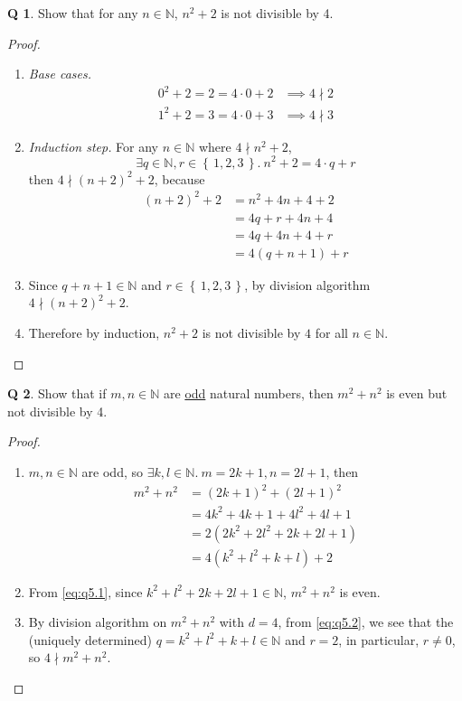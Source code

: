 \documentclass[12pt]{article}
\newcommand{\set}[1]{\left\{\,#1\,\right\}}
\theoremstyle{definition}
\newtheorem{qn}{Q}
\numberwithin{equation}{qn}
\newcommand{\nat}{\mathbb{N}}
\newenvironment{prf}
{
    \begin{proof}
        \hfill
        \begin{enumerate}[label*=\arabic*.]
                }
                {
                \hfill\qedsymbol
        \end{enumerate}
    \renewcommand{\qedsymbol}{}
    \end{proof}
}
\begin{document}
\newpage
\begin{qn}
    Show that for any $n \in\nat$, $n^2 + 2$ is not divisible by 4.
\end{qn}
\begin{prf}
\item \emph{Base cases.}
    \begin{align*}
        0^2 + 2 = 2 = 4\cdot0 + 2&\implies 4 \nmid 2 \\
        1^2 + 2 = 3 = 4\cdot0 + 3&\implies 4 \nmid 3
    \end{align*}
\item \emph{Induction step.} For any $n\in\nat$ where $4 \nmid n^2 + 2$,
    $$\exists q\in\nat, r\in\set{1,2,3}.~ n^2 + 2 = 4\cdot q + r$$
    then $4\nmid (n+2)^2 + 2$, because
    \begin{align*}
        (n+2)^2 + 2 &= n^2 + 4n + 4 + 2     \\
                    &= 4q + r + 4n + 4      \\
                    &= 4q + 4n + 4 + r      \\
                    &= 4(q + n + 1) + r
    \end{align*}
\item Since $q + n + 1 \in\nat$ and $r\in\set{1,2,3}$, by division algorithm $4\nmid (n+2)^2 + 2$.
\item Therefore by induction, $n^2 + 2$ is not divisible by $4$ for all $n\in\nat$.
\end{prf}

\begin{qn}
    Show that if $m,n\in\nat$ are \underline{odd} natural numbers,
    then $m^2 + n^2$ is even but not divisible by 4.
\end{qn}
\begin{prf}
\item $m,n \in\nat$ are odd, so $\exists k, l\in\nat.~ m=2k+1, n=2l+1$, then
    \begin{align}
        m^2 + n^2 &= (2k+1)^2 + (2l+1)^2    \\
        &= 4k^2 + 4k + 1 + 4l^2 + 4l + 1    \\
        &= 2(2k^2 + 2l^2 + 2k + 2l + 1)     \label{eq:q5.1} \\
        &= 4(k^2 + l^2 + k + l) + 2         \label{eq:q5.2}
    \end{align}
\item From \eqref{eq:q5.1}, since $k^2 + l^2 + 2k + 2l + 1 \in\nat$, $m^2 + n^2$ is even.
\item By division algorithm on $m^2 + n^2$ with $d=4$, from \eqref{eq:q5.2}, we see that the
    (uniquely determined) $q = k^2 + l^2 + k + l \in\nat$ and $r=2$, in particular, $r\ne 0$,
    so $4\nmid m^2 + n^2$.
\end{prf}
\newpage
\end{document}
